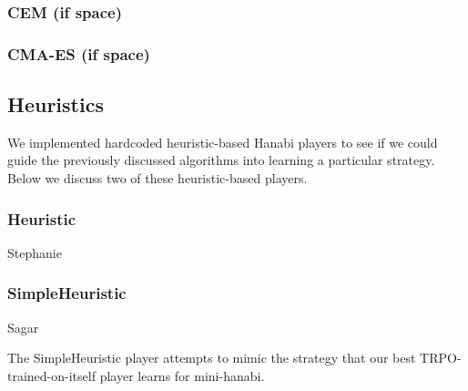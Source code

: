 \subsubsection{CEM (if space)}
\subsubsection{CMA-ES (if space)}

\subsection{Heuristics}

We implemented hardcoded heuristic-based Hanabi players to see if we could
guide the previously discussed algorithms into learning a particular strategy.
Below we discuss two of these heuristic-based players.

\subsubsection{Heuristic}

Stephanie

\subsubsection{SimpleHeuristic}

Sagar

The SimpleHeuristic player attempts to mimic the strategy that our best
TRPO-trained-on-itself player learns for mini-hanabi.

